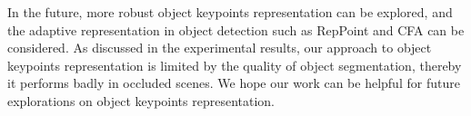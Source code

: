 \documentclass[a4paper, 10pt, conference]{IEEEtran}
\begin{document}
In the future, more robust object keypoints representation can be explored, and the adaptive representation in object detection such as RepPoint \cite{RepPoints} and CFA \cite{CFA} can be considered. As discussed in the experimental results, our approach to object keypoints representation is limited by the quality of object segmentation, thereby it performs badly in occluded scenes. We hope our work can be helpful for future explorations on object keypoints representation.  



  

\end{document}
